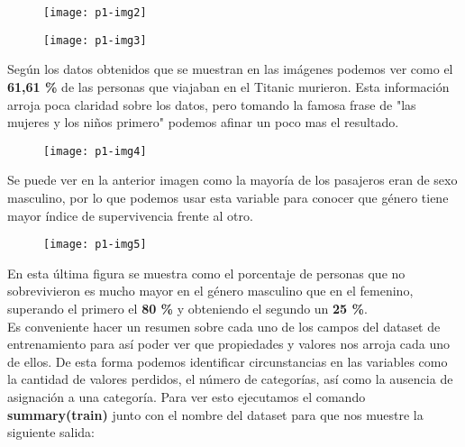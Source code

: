 \documentclass[10pt]{article}
\begin{document}
\begin{figure}[H]
	\begin{center}
 		\texttt{[image: p1-img2]}
	\end{center} 
\end{figure}

\begin{figure}[H]
	\begin{center}
 		\texttt{[image: p1-img3]}
	\end{center} 
\end{figure}

Según los datos obtenidos que se muestran en las imágenes podemos ver como el \textbf{61,61 \%} de las  personas que viajaban en el Titanic murieron. Esta información arroja poca claridad sobre los datos, pero tomando la famosa frase de "las mujeres y los niños primero" podemos afinar un poco mas el resultado.\\

\begin{figure}[H]
	\begin{center}
 		\texttt{[image: p1-img4]}
	\end{center} 
\end{figure}

Se puede ver en la anterior imagen como la mayoría de los pasajeros eran de sexo masculino, por lo que podemos usar esta variable para conocer que género tiene mayor índice de supervivencia frente al otro. \\

\begin{figure}[H]
	\begin{center}
 		\texttt{[image: p1-img5]}
	\end{center} 
\end{figure}

En esta última figura se muestra como el porcentaje de personas que no sobrevivieron es mucho mayor en el género masculino que en el femenino, superando el primero el \textbf{80 \%} y obteniendo el segundo un \textbf{25 \%}.\\

Es conveniente hacer un resumen sobre cada uno de los campos del dataset de entrenamiento para así poder ver que propiedades y valores nos arroja cada uno de ellos. De esta forma podemos identificar circunstancias en las variables como la cantidad de valores perdidos, el número de categorías, así como la ausencia de asignación a una categoría. Para ver esto ejecutamos el comando \textbf{summary(train)} junto con el nombre del dataset para que nos muestre la siguiente salida:
\end{document}
